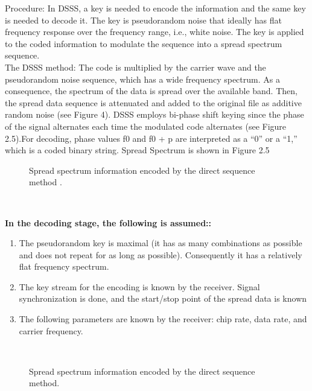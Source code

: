 \documentclass[a4paper, 12pt, notitlepage]{report}
\begin{document}
Procedure: In DSSS, a key is needed to encode the information and the same key is needed to decode it. The key is pseudorandom noise that ideally has flat frequency response over the frequency range, i.e., white noise. The key is applied to the coded information to modulate the sequence into a spread spectrum sequence.\\

The DSSS method: The code is multiplied by the carrier wave and the pseudorandom noise sequence, which has a wide frequency spectrum. As a consequence, the spectrum of the data is spread over the available band. Then, the spread data sequence is attenuated and added to the original file as additive random noise (see Figure 4). DSSS employs bi-phase shift keying since the phase of the signal alternates each time the modulated code alternates (see Figure 2.5).For decoding, phase values f0 and f0 + p are interpreted as a “0” or a “1,” which is a coded binary string. Spread Spectrum is shown in Figure 2.5\\

\begin{figure}[h!]
{\par}
\caption{Spread spectrum information encoded by the direct sequence method .}
\end{figure}\\
 
\begin{block}{\textbf{In the decoding stage, the following is assumed::}}
\begin{enumerate}
  \item {
    The pseudorandom key is maximal (it has as many combinations as possible and does not repeat for as long as possible). Consequently it has a relatively flat frequency spectrum.  
  }
	\item {
		The key stream for the encoding is known by the receiver. Signal synchronization is done, and the start/stop point of the spread data is known
  }
	\item {
    The following parameters are known by the receiver: chip rate, data rate, and carrier frequency.}
  \end{enumerate}
\end{block}\\

\begin{figure}[h!]
{\par}
\caption{Spread spectrum information encoded by the direct sequence method.}
\end{figure}\\
\end{document}
